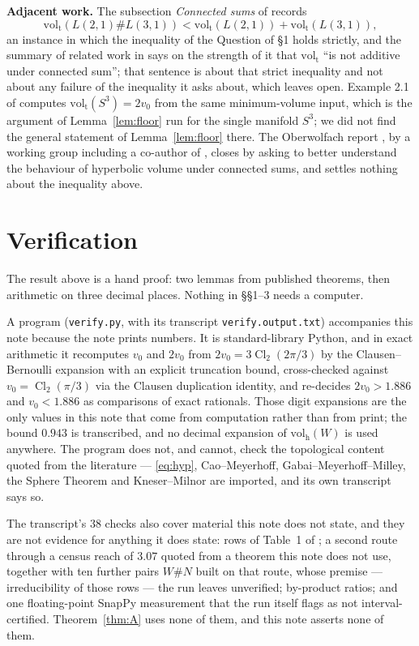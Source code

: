 \documentclass[11pt]{amsart}
\theoremstyle{definition}
\theoremstyle{remark}
\newcommand{\volt}{\operatorname{vol_t}}
\newcommand{\volh}{\operatorname{vol_h}}
\begin{document}
\medskip
\noindent\textbf{Adjacent work.} The subsection \emph{Connected sums} of \cite{KRSTT}
records
\[
  \volt(L(2,1)\# L(3,1))<\volt(L(2,1))+\volt(L(3,1)),
\]
an instance in which the
inequality of the Question of \S1 holds strictly, and the summary of related work in
\cite{KRSTT} says on the strength of it that $\volt$ ``is not additive under connected
sum''; that sentence is about that strict inequality and not about any failure of the
inequality it asks about, which \cite{KRSTT} leaves open. Example 2.1 of
\cite{KRSTT} computes $\volt(S^3)=2v_0$ from the same minimum-volume input, which is the
argument of Lemma~\ref{lem:floor} run for the single manifold $S^3$; we did not find the
general statement of Lemma~\ref{lem:floor} there. The
Oberwolfach report \cite{Oberwolfach}, by a working group including a co-author of
\cite{KRSTT}, closes by asking to better understand the behaviour of hyperbolic volume under
connected sums, and settles nothing about the inequality above.

\section{Verification}

The result above is a hand proof: two lemmas from published theorems, then arithmetic on
three decimal places. Nothing in \S\S1--3 needs a computer.

A program (\texttt{verify.py}, with its transcript \texttt{verify.output.txt}) accompanies
this note because the note prints numbers. It is standard-library Python, and in exact
arithmetic it recomputes $v_0$ and $2v_0$ from $2v_0=3\operatorname{Cl}_2(2\pi/3)$ by the
Clausen--Bernoulli expansion with an explicit truncation bound, cross-checked against
$v_0=\operatorname{Cl}_2(\pi/3)$ via the Clausen duplication identity, and re-decides
$2v_0>1.886$ and $v_0<1.886$ as comparisons of exact rationals. Those digit expansions are
the only values in this note that come from computation rather than from print; the bound
$0.943$ is transcribed, and no decimal expansion of $\volh(W)$ is used anywhere. The program
does not, and cannot, check the topological content quoted from the literature ---
\eqref{eq:hyp}, Cao--Meyerhoff, Gabai--Meyerhoff--Milley, the Sphere Theorem and
Kneser--Milnor are imported, and its own transcript says so.

The transcript's $38$ checks also cover material this note does not state, and they are not
evidence for anything it does state: rows of Table~1 of \cite{KRSTT}; a second route through
a census reach of $3.07$ quoted from a theorem this note does not use, together with ten
further pairs $W\# N$ built on that route, whose premise --- irreducibility of those rows ---
the run leaves unverified; by-product ratios; and one floating-point SnapPy measurement that
the run itself flags as not interval-certified. Theorem~\ref{thm:A} uses none of them, and
this note asserts none of them.
\end{document}

